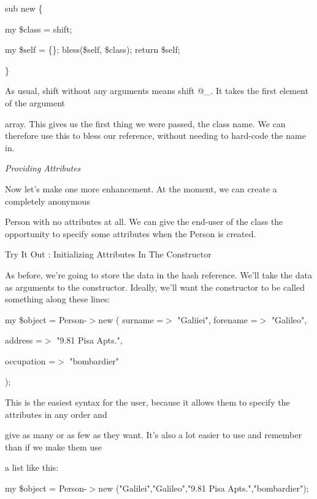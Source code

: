 \documentclass[a4paper,11pt]{book}
\begin{document}
\noindent sub new \{

\noindent my \$class = shift;

\noindent my \$self = \{\}; bless(\$self, \$class); return \$self;

\noindent \}

\noindent 

\noindent As usual, shift without any arguments means shift @\_. It takes the first element of the argument

\noindent array. This gives us the first thing we were passed, the class name. We can therefore use this to bless our reference, without needing to hard-code the name in.

\noindent 

\noindent \textit{Providing Attributes}

\noindent Now let's make one more enhancement. At the moment, we can create a completely anonymous

\noindent Person with no attributes at all. We can give the end-user of the class the opportunity to specify some attributes when the Person is created.

\noindent 

\noindent Try It Out : Initializing Attributes In The Constructor

\noindent As before, we're going to store the data in the hash reference. We'll take the data as arguments to the constructor. Ideally, we'll want the constructor to be called something along these lines:

\noindent 

\noindent my \$object = Person-$>$new ( surname =$>$ "Galiiei", forename =$>$ "Galileo",

\noindent address =$>$ "9.81 Pisa Apts.",

\noindent occupation =$>$ "bombardier"

\noindent );

\noindent 

\noindent 

\noindent This is the easiest syntax for the user, because it allows them to specify the attributes in any order and

\noindent give as many or as few as they want. It's also a lot easier to use and remember than if we make them use

\noindent a list like this:

\noindent 

\noindent my \$object = Person-$>$new ("Galilei","Galileo","9.81 Pisa Apts.","bombardier");
\end{document}
